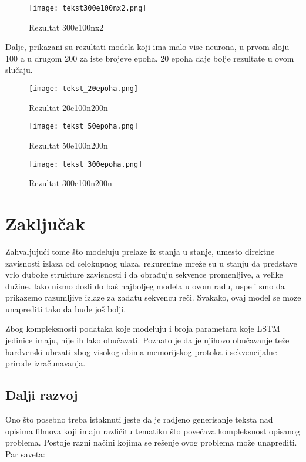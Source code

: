 \documentclass[a4paper]{article}
\begin{document}
\begin{figure}[!h]
    \centering
    \texttt{[image: tekst300e100nx2.png]}
    \caption{Rezultat 300e100nx2}
    \label{fig:Rezultat300e100n}
\end{figure}

Dalje, prikazani su rezultati modela koji ima malo vise neurona, u prvom sloju 100 a u drugom 200 za iste brojeve epoha. 20 epoha daje bolje rezultate u ovom slučaju. 

\begin{figure}[!h]
    \centering
    \texttt{[image: tekst\_20epoha.png]}
    \caption{Rezultat 20e100n200n}
    \label{fig:Rezultat20e100n200n}
\end{figure}
\begin{figure}[!h]
    \centering
    \texttt{[image: tekst\_50epoha.png]}
    \caption{Rezultat 50e100n200n}
    \label{fig:Rezultat50e100n200n}
\end{figure}

\begin{figure}[!h]
    \centering
    \texttt{[image: tekst\_300epoha.png]}
    \caption{Rezultat 300e100n200n}
    \label{fig:Rezultat300e100n200n}
\end{figure}

\section{Zaključak}

Zahvaljujući tome što modeluju prelaze iz stanja u stanje, umesto direktne zavisnosti izlaza od celokupnog ulaza, rekurentne mreže su u stanju da predstave vrlo duboke strukture zavisnosti i da obrađuju sekvence promenljive, a velike dužine. Iako nismo dosli do baš najboljeg modela u ovom radu, uspeli smo da prikazemo razumljive izlaze za zadatu sekvencu reči. Svakako, ovaj model se moze unaprediti tako da bude još bolji.

Zbog kompleksnosti podataka koje modeluju i broja parametara koje LSTM jedinice imaju, nije ih lako obučavati. Poznato je da je njihovo obučavanje teže hardverski ubrzati zbog visokog obima memorijskog protoka i sekvencijalne prirode izračunavanja.

\subsection{Dalji razvoj}
Ono što posebno treba istaknuti jeste da je radjeno
generisanje teksta nad opisima filmova koji imaju različitu tematiku što povećava kompleksnost opisanog problema.
Postoje razni načini kojima se rešenje ovog problema može unaprediti. Par saveta:  
\end{document}
